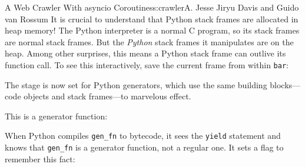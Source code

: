 \begin{aosachapter}{A Web Crawler With asyncio Coroutines}{s:crawler}{A. Jesse Jiryu Davis and Guido van Rossum}
It is crucial to understand that Python stack frames are allocated in
heap memory! The Python interpreter is a normal C program, so its stack
frames are normal stack frames. But the \emph{Python} stack frames it
manipulates are on the heap. Among other surprises, this means a Python
stack frame can outlive its function call. To see this interactively,
save the current frame from within \texttt{bar}:

\begin{Shaded}
\begin{Highlighting}[]
\NormalTok{>>> } 
\NormalTok{>>> } 
\NormalTok{>>> } 
 
\NormalTok{>>> }
\NormalTok{>>> }
\end{Highlighting}
\end{Shaded}

The stage is now set for Python generators, which use the same building
blocks---code objects and stack frames---to marvelous effect.

This is a generator function:

\begin{Shaded}
\begin{Highlighting}[]
\NormalTok{>>> } 
 
\NormalTok{(}
 
\NormalTok{(}
 
\end{Highlighting}
\end{Shaded}

When Python compiles \texttt{gen\_fn} to bytecode, it sees the
\texttt{yield} statement and knows that \texttt{gen\_fn} is a generator
function, not a regular one. It sets a flag to remember this fact:


\end{aosachapter}
